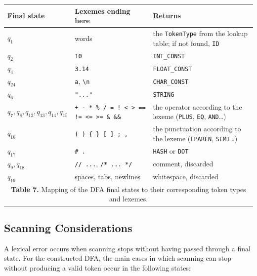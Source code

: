 \documentclass[12pt,letterpaper]{article}
\newcommand{\cd}[1]{\texttt{#1}}                       %
\begin{document}
\begin{center}
\small
\begin{tabularx}{\textwidth}{@{}l p{4.6cm} X@{}}
\toprule
\textbf{Final state} & \textbf{Lexemes ending here} & \textbf{Returns} \\
\midrule
$q_1$ & words & the \cd{TokenType} from the lookup table; if not found, \cd{ID} \\
$q_2$ & \cd{10} & \cd{INT\_CONST} \\
$q_4$ & \cd{3.14} & \cd{FLOAT\_CONST} \\
$q_{24}$ & \cd{\textquotesingle a\textquotesingle}, \cd{\textquotesingle\textbackslash n\textquotesingle} & \cd{CHAR\_CONST} \\
$q_6$ & \cd{"..."} & \cd{STRING} \\
$q_7, q_8, q_{12}, q_{13}, q_{14}, q_{15}$ & \cd{+ - * \% / = ! < > == != <= >= \& \&\& \textbar\ \textbar\textbar} & the operator according to the lexeme (\cd{PLUS}, \cd{EQ}, \cd{AND}\ldots) \\
$q_{16}$ & \cd{( ) \{ \} [ ] ; ,} & the punctuation according to the lexeme (\cd{LPAREN}, \cd{SEMI}\ldots) \\
$q_{17}$ & \cd{\# .} & \cd{HASH} or \cd{DOT} \\
$q_9, q_{18}$ & \cd{// ...}, \cd{/* ... */} & comment, discarded \\
$q_{19}$ & spaces, tabs, newlines & whitespace, discarded \\
\bottomrule
\multicolumn{3}{c}{\vspace{2pt}\footnotesize \textbf{Table 7.} Mapping of the DFA final states to their corresponding token types and lexemes.} \\
\end{tabularx}
\end{center}

\subsection{Scanning Considerations}

A lexical error occurs when scanning stops without having passed through a final state. For the constructed DFA, the main cases in which scanning can stop without producing a valid token occur in the following states:
\end{document}
